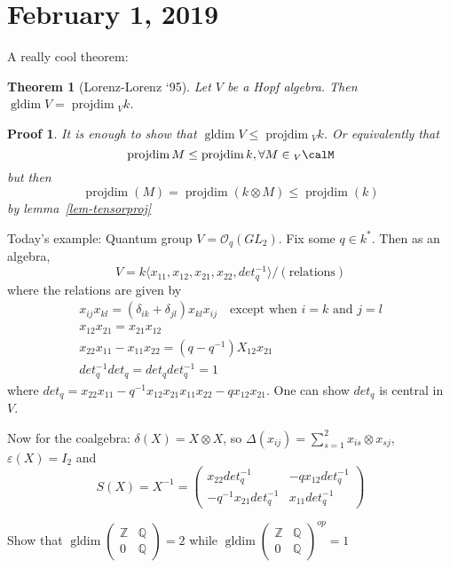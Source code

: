 \documentclass[12pt]{article}
\theoremstyle{break}
\theoremstyle{nonumberbreak}
\theoremstyle{changebreak}
\newtheorem{thm}{Theorem}[subsection]
\theoremstyle{break}
\theoremstyle{nonumberbreak}
\newtheorem{prf}{Proof}
\theoremstyle{nonumberplain}
\theoremstyle{change}
\newcommand*{\Z}{
\mathbb{Z}
}
\newcommand*{\Q}{
\mathbb{Q}
}
\DeclareMathOperator{\gldim}{gldim}
\DeclareMathOperator{\projdim}{projdim}
\begin{document}
\section{February 1, 2019}
A really cool theorem:
\begin{thm}[Lorenz-Lorenz `95]
	Let $V$ be a Hopf algebra. Then $\gldim V=\projdim {_Vk}$.
\end{thm}
\begin{prf}
	It is enough to show that $\gldim V\le\projdim{_Vk}$. Or equivalently that
	\[\projdim M\le \projdim k,\forall M\in{_V\calM}\]
	but then
	\[\projdim(M)=\projdim(k\otimes M)\le \projdim(k)\]
	by lemma~\ref{lem-tensorproj}
\end{prf}
\begin{ex}
	Today's example: Quantum group $V=\mathcal{O}_q(GL_2)$. Fix some $q\in k^*$. Then as an algebra, 
	\[V=k\langle x_{11},x_{12},x_{21},x_{22},det_q^{-1}\rangle/(\text{relations})\]
	where the relations are given by 
	\begin{align*}
		x_{ij}x_{kl}=(\delta_{ik}+\delta_{jl})x_{kl}x_{ij}\quad\text{except when } i=k \text{ and } j=l\\
		x_{12}x_{21}=x_{21}x_{12}\\
		x_{22}x_{11}-x_{11}x_{22}=(q-q^{-1})X_{12}x_{21}\\
		det_q^{-1}det_q=det_q det_q^{-1}=1
	\end{align*}
	where $det_q=x_{22}x_{11}-q^{-1}x_{12}x_{21}x_{11}x_{22}-qx_{12}x_{21}$. One can show $det_q$ is central in $V$.

	Now for the coalgebra: $\delta(X)=X\otimes X$, so $\Delta(x_{ij})=\sum_{s=1}^2 x_{is}\otimes x_{sj}$, $\varepsilon(X)=I_2$ and
	\[S(X)=X^{-1}=\begin{pmatrix}
		x_{22}det_q^{-1} & -qx_{12}det_q^{-1}\\
		-q^{-1}x_{21}det_q^{-1} & x_{11}det_q^{-1}
	\end{pmatrix}\]
\end{ex}
\begin{prob}
	Show that $\gldim(\begin{smallmatrix}\Z & \Q\\0 & \Q\end{smallmatrix})=2$ while $\gldim(\begin{smallmatrix}\Z & \Q\\0 & \Q\end{smallmatrix})^{op}=1$
\end{prob}
\end{document}
